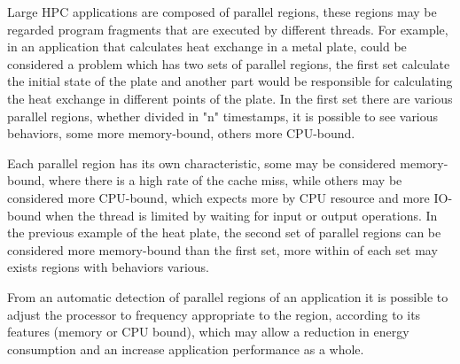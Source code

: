 \documentclass[conference,letter,10pt,final]{IEEEtran}
\begin{document}
Large HPC applications are composed of parallel regions, these regions
may be regarded program fragments that are executed by different
threads. For example, in an application that calculates heat exchange
in a metal plate, could be considered a problem which has two sets of
parallel regions, the first set calculate the initial state of the
plate and another part would be responsible for calculating the heat
exchange in different points of the plate. In the first set there are
various parallel regions, whether divided in "n" timestamps, it is
possible to see various behaviors, some more memory-bound, others more
CPU-bound. 


Each parallel region has its own characteristic, some may be
considered memory-bound, where there is a high rate of the
cache miss, while others may be considered more CPU-bound, which
expects more by CPU resource and more IO-bound when the thread is
limited by waiting for input or output operations. In the previous
example of the heat plate, the second  set of parallel regions can be
considered more memory-bound than the first set, more within of each
set may exists regions with behaviors various.  


From an automatic detection of parallel regions of an application it
is possible to adjust the processor to frequency appropriate to the
region, according to its features (memory or CPU bound), which may allow
a reduction in energy consumption and an increase application
performance as a whole.

\end{document}
